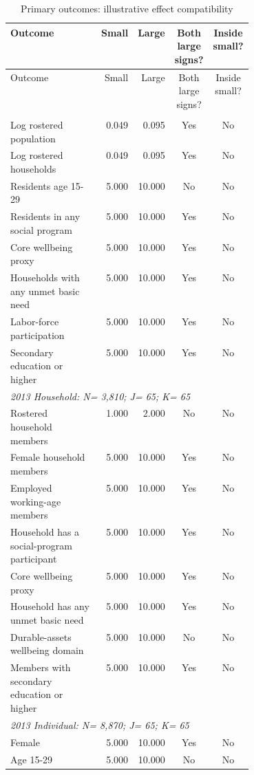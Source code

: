 \begin{longtable}{@{}p{0.41\linewidth}rrcc@{}}
\caption{Primary outcomes: illustrative effect compatibility}\label{tab:illustrative_precision}\\
\toprule Outcome & Small & Large & Both large signs? & Inside small? \\
\midrule\endfirsthead
\toprule Outcome & Small & Large & Both large signs? & Inside small? \\
\midrule\endhead\bottomrule\endfoot
\multicolumn{5}{l}{\textit{2013 Community: N=       65; J=       65; K=       45}}\\*
Log rostered population &  0.049 &  0.095 & Yes & No \\
Log rostered households &  0.049 &  0.095 & Yes & No \\
Residents age 15-29 &  5.000 & 10.000 & No & No \\
Residents in any social program &  5.000 & 10.000 & Yes & No \\
Core wellbeing proxy &  5.000 & 10.000 & Yes & No \\
Households with any unmet basic need &  5.000 & 10.000 & Yes & No \\
Labor-force participation &  5.000 & 10.000 & Yes & No \\
Secondary education or higher &  5.000 & 10.000 & Yes & No \\
\multicolumn{5}{l}{\textit{2013 Household: N=    3,810; J=       65; K=       65}}\\*
Rostered household members &  1.000 &  2.000 & No & No \\
Female household members &  5.000 & 10.000 & Yes & No \\
Employed working-age members &  5.000 & 10.000 & Yes & No \\
Household has a social-program participant &  5.000 & 10.000 & Yes & No \\
Core wellbeing proxy &  5.000 & 10.000 & Yes & No \\
Household has any unmet basic need &  5.000 & 10.000 & Yes & No \\
Durable-assets wellbeing domain &  5.000 & 10.000 & No & No \\
Members with secondary education or higher &  5.000 & 10.000 & Yes & No \\
\multicolumn{5}{l}{\textit{2013 Individual: N=    8,870; J=       65; K=       65}}\\*
Female &  5.000 & 10.000 & Yes & No \\
Age 15-29 &  5.000 & 10.000 & No & No \\

\end{longtable}
